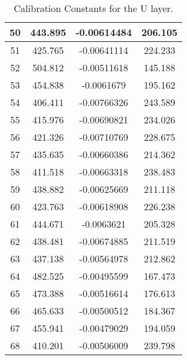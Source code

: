 \begin{table}[h]
{\begin{tabular}{|c|c|c|c|}
50   &   443.895   &   -0.00614484   &   206.105  \\  \hline  
51   &   425.765   &   -0.00641114   &   224.233  \\  \hline  
52   &   504.812   &   -0.00511618   &   145.188  \\  \hline  
53   &   454.838   &   -0.0061679   &   195.162  \\  \hline  
54   &   406.411   &   -0.00766326   &   243.589  \\  \hline  
55   &   415.976   &   -0.00690821   &   234.026  \\  \hline  
56   &   421.326   &   -0.00710769   &   228.675  \\  \hline  
57   &   435.635   &   -0.00660386   &   214.362  \\  \hline  
58   &   411.518   &   -0.00663318   &   238.483  \\  \hline  
59   &   438.882   &   -0.00625669   &   211.118  \\  \hline  
60   &   423.763   &   -0.00618908   &   226.238  \\  \hline  
61   &   444.671   &   -0.0063621   &   205.328  \\  \hline  
62   &   438.481   &   -0.00674885   &   211.519  \\  \hline  
63   &   437.138   &   -0.00564978   &   212.862  \\  \hline  
64   &   482.525   &   -0.00495599   &   167.473  \\  \hline  
65   &   473.388   &   -0.00516614   &   176.613  \\  \hline  
66   &   465.633   &   -0.00500512   &   184.367  \\  \hline  
67   &   455.941   &   -0.00479029   &   194.059  \\  \hline  
68   &   410.201   &   -0.00506009   &   239.798  \\  \hline  
        \end{tabular}
        }
        \caption{Calibration Constants for the U layer.}
\end{table}



